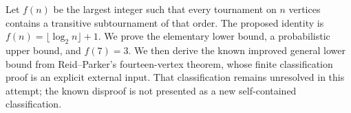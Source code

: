 Let $f(n)$ be the largest integer such that every tournament on $n$ vertices contains a transitive subtournament of that order. The proposed identity is $f(n)=\lfloor\log_2n\rfloor+1$.
We prove the elementary lower bound, a probabilistic upper bound, and $f(7)=3$. We then derive the known improved general lower bound from Reid--Parker's fourteen-vertex theorem, whose finite classification proof is an explicit external input. That classification remains unresolved in this attempt; the known disproof is not presented as a new self-contained classification.
